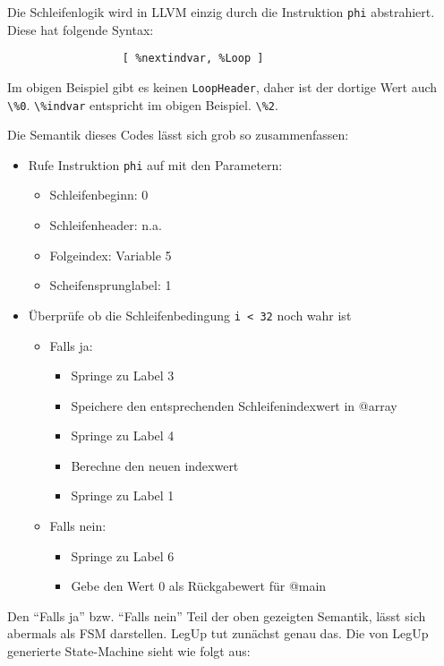 \documentclass[oneside,a4paper]{article}
\def\A#1{\lstinline[style=asm]{#1}}
\def\C#1{\lstinline[style=c]{#1}}
\begin{document}
Die Schleifenlogik wird in LLVM einzig durch die Instruktion \A{phi} abstrahiert.
Diese hat folgende Syntax:

\begin{lstlisting}[style=asm]
%indvar = phi i32 [ 0, %LoopHeader ],
                  [ %nextindvar, %Loop ]
\end{lstlisting}

Im obigen Beispiel gibt es keinen \A{LoopHeader}, daher ist der dortige
Wert auch \A{\%0}. \A{\%indvar} entspricht im obigen Beispiel. \A{\%2}.


Die Semantik dieses Codes lässt sich grob so zusammenfassen:
\begin{itemize}
    \item Rufe Instruktion \A{phi} auf mit den Parametern:
    \begin{itemize}
        \item Schleifenbeginn: 0
        \item Schleifenheader: n.a.
        \item Folgeindex: Variable 5
        \item Scheifensprunglabel: 1
    \end{itemize}
    \item Überprüfe ob die Schleifenbedingung \C{i < 32} noch wahr ist
    \begin{itemize}
        \item Falls ja:
        \begin{itemize}
            \item Springe zu Label 3
            \item Speichere den entsprechenden Schleifenindexwert in @array
            \item Springe zu Label 4
            \item Berechne den neuen indexwert
            \item Springe zu Label 1
        \end{itemize}
        \item Falls nein:
        \begin{itemize}
            \item Springe zu Label 6
            \item Gebe den Wert 0 als Rückgabewert für @main
        \end{itemize}
    \end{itemize}
\end{itemize}

Den ``Falls ja'' bzw. ``Falls nein'' Teil der oben gezeigten Semantik,
lässt sich abermals als FSM darstellen. LegUp tut zunächst genau das.
Die von LegUp generierte State-Machine sieht wie folgt aus:
\end{document}
